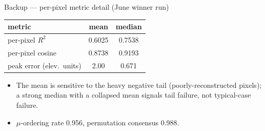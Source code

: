 \begin{frame}{Backup --- per-pixel metric detail (June winner run)}
  \small
  \begin{center}
  \begin{tabular}{@{}lcc@{}}
    \toprule
    metric & mean & median \\
    \midrule
    per-pixel $R^2$        & 0.6025 & 0.7538 \\
    per-pixel cosine       & 0.8738 & 0.9193 \\
    peak error (elev.\ units) & 2.00 & 0.671 \\
    \bottomrule
  \end{tabular}
  \end{center}
  \begin{itemize}
    \item The mean is sensitive to the heavy negative tail (poorly-reconstructed
          pixels); a strong median with a collapsed mean signals tail failure, not
          typical-case failure.
    \item $\mu$-ordering rate 0.956, permutation consensus 0.988.
  \end{itemize}
\end{frame}

